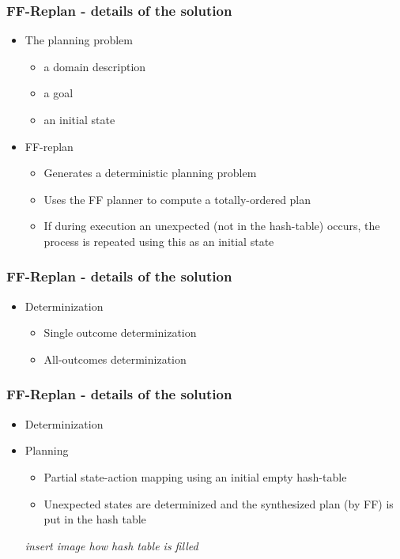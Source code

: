 \documentclass{beamer}
\let\origframetitle=\frametitle
\renewcommand\frametitle[1]{\origframetitle{\textbf{\large{\textrm{#1}}}}}
\begin{document}
\begin{frame}
  \frametitle{FF-Replan - details of the solution}

  \begin{itemize}
    \item The planning problem
	\begin{itemize}
        	\item a domain description
	\item a goal
	\item an initial state 
	\end{itemize}
   \item FF-replan
	\begin{itemize}
	\item Generates a deterministic planning problem
	\item Uses the FF planner to compute a totally-ordered plan
	\item If during execution an unexpected (not in the hash-table) occurs, the process is repeated using this as an initial state
	\end{itemize}
  \end{itemize}
\end{frame}

\begin{frame}
  \frametitle{FF-Replan - details of the solution}

  \begin{itemize}
    \item Determinization
	\begin{itemize}
        	\item Single outcome determinization
	\item All-outcomes determinization
	\end{itemize}
   \end{itemize}
\end{frame}

\begin{frame}
  \frametitle{FF-Replan - details of the solution}

  \begin{itemize}
    \item Determinization
   \item Planning
	\begin{itemize}
	\item Partial state-action mapping using an initial empty hash-table
	\item Unexpected states are determinized and the synthesized plan (by FF) is put in the hash table
	\end{itemize}

\emph{ insert image how hash table is filled}

   \end{itemize}
\end{frame}
\end{document}
